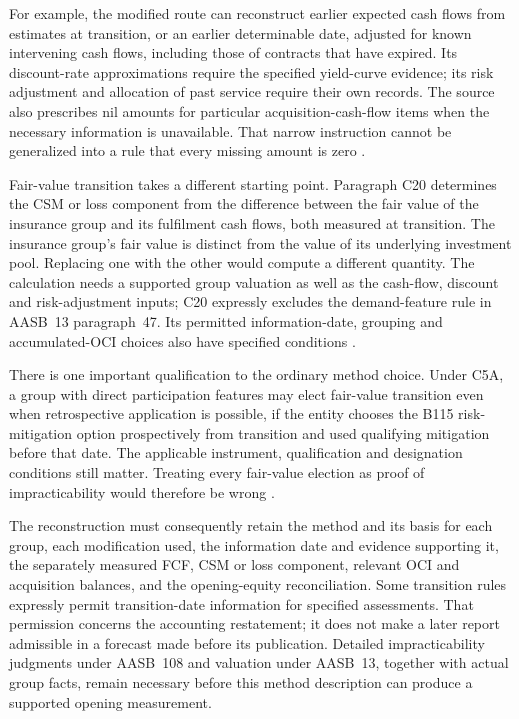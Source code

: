For example, the modified route can reconstruct earlier expected cash flows
from estimates at transition, or an earlier determinable date, adjusted for
known intervening cash flows, including those of contracts that have expired.
Its discount-rate approximations require the specified yield-curve evidence;
its risk adjustment and allocation of past service require their own records.
The source also prescribes nil amounts for particular acquisition-cash-flow
items when the necessary information is unavailable. That narrow instruction
cannot be generalized into a rule that every missing amount is zero
\citep[paragraphs C12--C16]{aasb17}.

Fair-value transition takes a different starting point. Paragraph C20 determines
the CSM or loss component from the difference between the fair value of the
insurance group and its fulfilment cash flows, both measured at transition.
The insurance group's fair value is distinct from the value of its underlying
investment pool. Replacing one with the other would compute a different
quantity. The calculation needs a supported group valuation as well as the
cash-flow, discount and risk-adjustment inputs; C20 expressly excludes the
demand-feature rule in AASB~13 paragraph~47. Its permitted information-date,
grouping and accumulated-OCI choices also have specified conditions
\citep[paragraphs C20--C24B]{aasb17}.

\clearpage
There is one important qualification to the ordinary method choice. Under
C5A, a group with direct participation features may elect fair-value transition
even when retrospective application is possible, if the entity chooses the
B115 risk-mitigation option prospectively from transition and used qualifying
mitigation before that date. The applicable instrument, qualification and
designation conditions still matter. Treating every fair-value election as
proof of impracticability would therefore be wrong
\citep[paragraphs C3(b), C5A and B115--B118]{aasb17}.

The reconstruction must consequently retain the method and its basis for each
group, each modification used, the information date and evidence supporting
it, the separately measured FCF, CSM or loss component, relevant OCI and
acquisition balances, and the opening-equity reconciliation. Some transition
rules expressly permit transition-date information for specified assessments.
That permission concerns the accounting restatement; it does not make a later
report admissible in a forecast made before its publication. Detailed
impracticability judgments under AASB~108 and valuation under AASB~13, together
with actual group facts, remain necessary before this method description can
produce a supported opening measurement.


